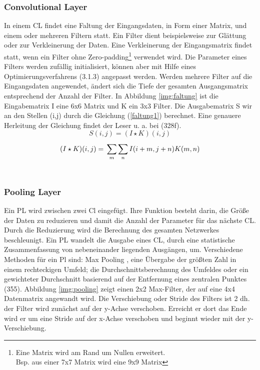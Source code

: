 \documentclass[twosided,a4,10pt]{article}
\begin{document}
\begin{multicols}{2}
		\subsubsection*{Convolutional Layer}
		In einem CL findet eine Faltung der Eingangsdaten, in Form einer Matrix, und einem oder mehreren Filtern statt. Ein Filter dient beispielsweise zur Glättung oder zur Verkleinerung der Daten. Eine Verkleinerung der Eingangsmatrix findet statt, wenn ein Filter ohne Zero-padding\footnote[6]{Eine Matrix wird am Rand um Nullen erweitert.\\ Bsp. aus einer 7x7 Matrix wird eine 9x9 Matrix} verwendet wird. Die Parameter eines Filters werden zufällig initialisiert, können aber mit Hilfe eines Optimierungsverfahrens (3.1.3) angepasst werden. Werden mehrere Filter auf die Eingangsdaten angewendet, ändert sich die Tiefe der gesamten Ausgangsmatrix entsprechend der Anzahl der Filter. \cite{karpathy}\newline
		In Abbildung \ref{img:faltung} ist die Eingabematrix I eine 6x6 Matrix und K ein 3x3 Filter. Die Ausgabematrix S wir an den Stellen (i,j) durch die Gleichung (\ref{faltung1}) berechnet. Eine genauere Herleitung der Gleichung findet der Leser u. a. bei \cite{goodfellow}(328f).
		\begin{equation}\label{faltung1}
		S(i,j) =(I \star K)(i,j)
		\end{equation}
		\begin{equation}\label{faltung2}
		(I \star K)(i,j) =\newline\sum_{m}^{}\sum_{n}^{}I(i+m,j+n)K(m,n)
		\end{equation}\newline\\
		
		\subsubsection*{Pooling Layer}
		Ein PL wird zwischen zwei Cl eingefügt. Ihre Funktion besteht darin, die Größe der Daten zu reduzieren und damit die Anzahl der Parameter für das nächste CL. Durch die Reduzierung wird die Berechnung des gesamten Netzwerkes beschleunigt. \cite{karpathy}\newline Ein PL wandelt die Ausgabe eines CL, durch eine statistische Zusammenfassung von nebeneinander liegenden Ausgängen, um. Verschiedene Methoden für ein Pl sind: Max Pooling \cite{zhou}, eine Übergabe der größten Zahl in einem rechteckigen Umfeld; die Durchschnittsberechnung des Umfeldes oder ein gewichteter Durchschnitt basierend auf der Entfernung eines zentralen Punktes \cite{goodfellow}(355).\newline
		Abbildung \ref{img:pooling} zeigt einen 2x2 Max-Filter, der auf eine 4x4 Datenmatrix angewandt wird. Die Verschiebung oder Stride des Filters ist 2 dh. der Filter wird zunächst auf der y-Achse verschoben. Erreicht er dort das Ende wird er um eine Stride auf der x-Achse verschoben und beginnt wieder mit der y-Verschiebung.\newline\\
		

\end{multicols}
\end{document}
